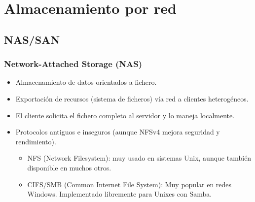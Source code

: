 \documentclass{beamer}
\begin{document}



\section{Almacenamiento por red}

\subsection{NAS/SAN}

\begin{frame}
  \frametitle{Network-Attached Storage (NAS)}
  \begin{itemize}
    \item Almacenamiento de datos \alert{orientados a fichero}.
    \item Exportación de recursos (sistema de ficheros) vía red a clientes heterogéneos.
    \item El cliente solicita el fichero completo al servidor y lo maneja localmente.
    \item Protocolos antiguos e inseguros (aunque NFSv4 mejora seguridad y rendimiento). 
	  \begin{itemize}
	    \item \alert{NFS} (Network Filesystem): muy usado en sistemas Unix, aunque también disponible en muchos otros. 
	    \item \alert{CIFS/SMB} (Common Internet File System): Muy popular en redes Windows. Implementado libremente para Unixes con \alert{Samba}.
	  \end{itemize}

  \end{itemize}
\end{frame}
\end{document}
